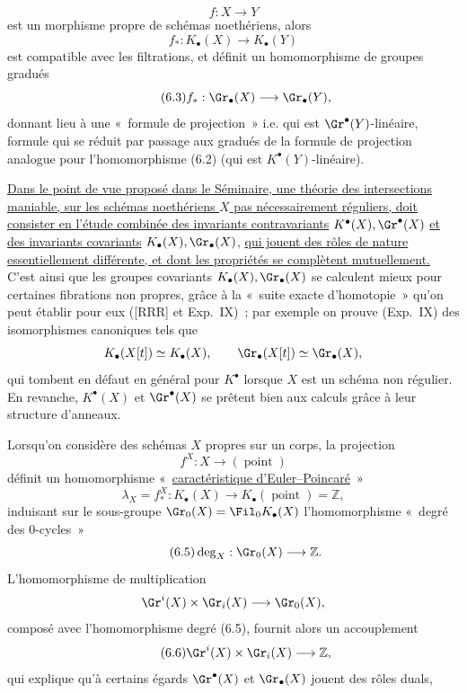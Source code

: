 \[
f:X\longrightarrow Y
\]
est un
morphisme propre de sch\'emas noeth\'eriens, alors
\begin{equation}\tag{6.2}
f_*:K_\bullet(X)\longrightarrow K_\bullet(Y)
\end{equation}
est compatible avec les filtrations, et d\'efinit un homomorphisme de groupes gradu\'es
\begin{equation}\tag{6.3}
f_*:\Gr_\bullet(X)\longrightarrow \Gr_\bullet(Y),
\end{equation}
donnant lieu \`a une «~formule de projection~» i.e. qui est $\Gr^\bullet(Y)$-lin\'eaire, formule qui se r\'eduit par passage aux gradu\'es de la formule de projection analogue pour l'homomorphisme (6.2) (qui est $K^\bullet(Y)$-lin\'eaire).

\uline{Dans le point de vue propos\'e dans le S\'eminaire, une th\'eorie des intersections maniable, sur les sch\'emas noeth\'eriens $X$ pas n\'ecessairement r\'eguliers, doit consister en l'\'etude combin\'ee des invariants contravariants} $K^\bullet(X),\Gr^\bullet(X)$ \uline{et des invariants covariants} $K_\bullet(X),\Gr_\bullet(X)$, \uline{qui jouent des r\^oles de nature essentiellement diff\'erente, et dont les propri\'et\'es se compl\`etent mutuellement.} C'est ainsi que les groupes covariants $K_\bullet(X),\Gr_\bullet(X)$ se calculent mieux pour certaines fibrations non propres, gr\^ace \`a la «~suite exacte d'homotopie~» qu'on peut \'etablir pour eux ([RRR] et Exp.\ IX)~; par exemple on prouve (Exp.\ IX) des isomorphismes canoniques tels que
\[
K_\bullet(X[t])\simeq K_\bullet(X),\qquad \Gr_\bullet(X[t])\simeq \Gr_\bullet(X),
\]
qui tombent en d\'efaut en g\'en\'eral pour $K^\bullet$ lorsque $X$ est un sch\'ema non r\'egulier. En revanche, $K^\bullet(X)$ et $\Gr^\bullet(X)$ se pr\^etent bien aux calculs gr\^ace \`a leur structure d'anneaux.

Lorsqu'on consid\`ere des sch\'emas $X$ propres sur un corps, la projection
\[
f^X:X\longrightarrow(\operatorname{point})
\]
d\'efinit un homomorphisme «~\uline{caract\'eristique d'Euler--Poincar\'e}~»
\begin{equation}\tag{6.4}
\lambda_X=f^X_*:K_\bullet(X)\longrightarrow K_\bullet(\operatorname{point})=\mathbb Z,
\end{equation}
induisant sur le sous-groupe $\Gr_0(X)=\Fil_0K_\bullet(X)$ l'homomorphisme «~degr\'e des $0$-cycles~»
\begin{equation}\tag{6.5}
\deg_X:\Gr_0(X)\longrightarrow \mathbb Z.
\end{equation}
L'homomorphisme de multiplication
\[
\Gr^i(X)\times\Gr_i(X)\longrightarrow \Gr_0(X),
\]
compos\'e avec l'homomorphisme degr\'e (6.5), fournit alors un accouplement
\begin{equation}\tag{6.6}
\Gr^i(X)\times \Gr_i(X)\longrightarrow \mathbb Z,
\end{equation}
qui explique qu'\`a certains \'egards $\Gr^\bullet(X)$ et $\Gr_\bullet(X)$ jouent des r\^oles duals,
